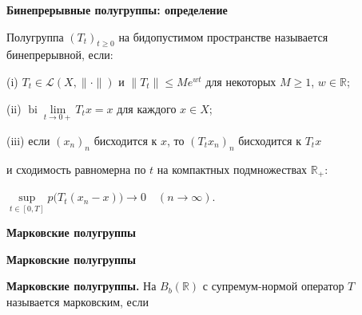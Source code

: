 \documentclass[11pt]{article}
\newcommand{\R}{\mathbb{R}}
\begin{document}
\newpage

\begin{center}
{\color{notaeYELLOW}\bfseries\fontsize{44}{52}\selectfont Бинепрерывные полугруппы: определение}
\end{center}
\vspace*{\fill}
\begin{center}
\fontsize{36}{43}\selectfont
\parbox{\linewidth}{\centering\noindent Полугруппа $(T_t)_{t\ge0}$ на бидопустимом пространстве называется бинепрерывной, если:
\par}\vspace{0.4in}
\parbox{\linewidth}{\centering\noindent (i) $T_t\in\mathcal{L}(X,\|\cdot\|)$ и $\|T_t\|\le Me^{wt}$ для некоторых $M\ge1$, $w\in\R$;
\par}\vspace{0.4in}
\parbox{\linewidth}{\centering\noindent (ii) $\operatorname{bi}\lim\limits_{t\to0+}T_t x=x$ для каждого $x\in X$;
\par}\vspace{0.4in}
\parbox{\linewidth}{\centering\noindent (iii) если $(x_n)_n$ бисходится к $x$, то $(T_t x_n)_n$ бисходится к $T_t x$
\par}\vspace{0.4in}
\parbox{\linewidth}{\centering\noindent и сходимость равномерна по $t$ на компактных подмножествах $\R_+$:
\par}\vspace{0.4in}
\parbox{\linewidth}{\centering\noindent $\sup\limits_{t\in[0,T]}p\bigl(T_t(x_n-x)\bigr)\to0\quad(n\to\infty).$
\par}\vspace{0.4in}
\end{center}
\vspace*{\fill}

\newpage

\begin{center}
{\color{notaeYELLOW}\bfseries\fontsize{44}{52}\selectfont Марковские полугруппы}
\end{center}
\vspace*{\fill}
\begin{center}
\fontsize{36}{43}\selectfont
\end{center}
\vspace*{\fill}

\newpage

\begin{center}
{\color{notaeYELLOW}\bfseries\fontsize{44}{52}\selectfont Марковские полугруппы}
\end{center}
\vspace*{\fill}
\begin{center}
\fontsize{36}{43}\selectfont
\parbox{\linewidth}{\centering\noindent \textbf{Марковские полугруппы.} На $B_b(\R)$ с супремум-нормой оператор $T$ называется марковским, если
\par}\vspace{0.4in}
\end{center}
\vspace*{\fill}
\end{document}
